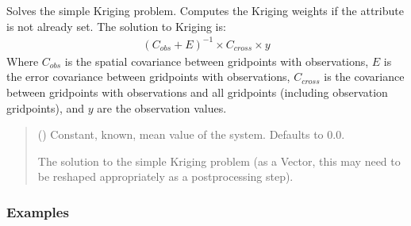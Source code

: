 \documentclass[letterpaper,10pt,english]{sphinxmanual}
\begin{document}
\begin{fulllineitems}
\begin{fulllineitems}
\label{\detokenize{kriging:glomar_gridding.kriging.SimpleKriging.solve}}
\pysigstartsignatures
\pysiglinewithargsret
{}
{}
{}
\pysigstopsignatures
\sphinxAtStartPar
Solves the simple Kriging problem. Computes the Kriging weights if the
 attribute is not already set. The solution to Kriging
is:
\begin{equation*}
\begin{split}(C_{obs} + E)^{-1} \times C_{cross} \times y\end{split}
\end{equation*}
\sphinxAtStartPar
Where \(C_{obs}\) is the spatial covariance between grid\sphinxhyphen{}points
with observations, \(E\) is the error covariance between grid\sphinxhyphen{}points
with observations, \(C_{cross}\) is the covariance between
grid\sphinxhyphen{}points with observations and all grid\sphinxhyphen{}points (including observation
grid\sphinxhyphen{}points), and \(y\) are the observation values.
\begin{quote}\begin{description}
\sphinxAtStartPar
{} () \textendash{} Constant, known, mean value of the system. Defaults to 0.0.

\sphinxAtStartPar
The solution to the simple Kriging problem (as a Vector, this may
need to be re\sphinxhyphen{}shaped appropriately as a post\sphinxhyphen{}processing step).

\sphinxAtStartPar
{}

\end{description}\end{quote}
\subsubsection*{Examples}

\begin{sphinxVerbatim}[commandchars=\\\{\}]
  
  
\end{sphinxVerbatim}

\end{fulllineitems}


\end{fulllineitems}
\end{document}
